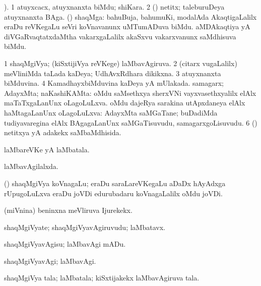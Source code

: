 \bentry
{} 
\gl{\nA}
). \bmng
\bnum
\num{1} atuyxcacx, atuyxnanxta biMdu; shiKara. 
\num{2} (\aMrashA) netitx; taleburuDeya atuyxnanxta BAga. 
 (\jAyx) shaqMga: 
\banum
{} bahuBuja, bahumuKi, modalAda AkaqtigaLalilx eraDu reVKegaLu seVri koVnavanunx uMTumADuva biMdu. 
 aMDAkaqtiya yA diVGaRvaqtatxdaMtha vakarxgaLalilx akaSxvu vakarxvanunx saMdhisuva biMdu. 
\eanum
\numie
\enum
\emng
\eentry

\bentry
{} 
\gl{\gu}
\expl{}
\bmng
\bnum
\num{1} shaqMgiVya; (kiSxtijiVya reVKege) laMbavAgiruva. 
\num{2} (citarx \mo vugaLalilx) meVliniMda taLada kaDeya; UdhAvxRdhara dikikxna. 
\num{3} atuyxnanxta biMduvina. 
\num{4} KamadhayxbiMduvina kaDeya yA mUlakada. 
 samagarx; AdayxMta; naKashiKAMta: 
\banum
{} oMdu saMsethxya sherxVNi vayxvasethxyalilx elAlx maTaTxgaLanUnx oLagoLuLxva. 
 oMdu dajeRya sarakina utApxdaneya elAlx haMtagaLanUnx oLagoLuLxva:  AdayxMta saMGaTane; buDadiMda tudiyavaregina elAlx BAgagaLanUnx saMGaTisuvudu, samagarxgoLisuvudu. 
\eanum
\numie
\num{6} (\aMrashA) netitxya yA adakekx saMbaMdhisida. 
\enum
\emng
\eentry

\bentry
{} 
\gl{\nA}
\bmng
laMbareVKe yA laMbatala. 
\emng

\noindent 
\gl{\pagu}
\bmng
  laMbavAgilalxda. 
\emng
\eentry

\bentry
{}
\gl{\nA}
\bmng
 (\ga) shaqMgiVya koVnagaLu; eraDu saraLareVKegaLu aDaDx hAyAdxga rUpugoLuLxva eraDu joVDi edurubadaru koVnagaLalilx oMdu joVDi. 
\emng
\eentry

\bentry
{}
\gl{\nA}
\bmng
 (miVnina) beninxna meVliruva Ijurekekx. 
\emng
\eentry

\bentry
{}
\gl{\nA}
\expl{}
\bmng
 shaqMgiVyate; shaqMgiVyavAgiruvudu; laMbatavx. 
\emng
\eentry

\bentry
{} 
\gl{\sakirx}
\expl{}
\bmng
 shaqMgiVyavAgisu; laMbavAgi mADu. 
\emng
\eentry

\bentry
{} 
\gl{\kirxvi}
\expl{}
\bmng
 shaqMgiVyavAgi; laMbavAgi. 
\emng
\eentry

\bentry
{} 
\gl{\nA}
\expl{}
\bmng
 shaqMgiVya tala; laMbatala; kiSxtijakekx laMbavAgiruva tala. 
\emng
\eentry

